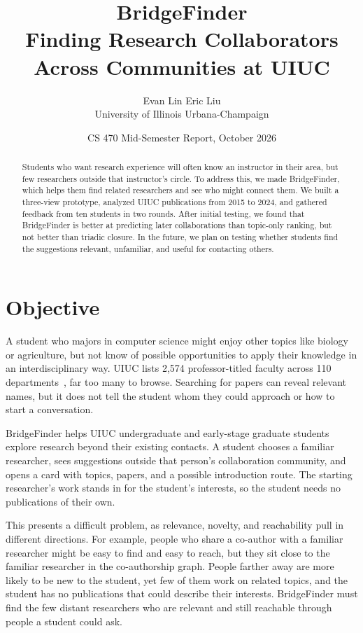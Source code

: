 \documentclass[10pt,twocolumn,letterpaper]{article}
\title{BridgeFinder\\Finding Research Collaborators Across Communities at UIUC}
\author{Evan Lin \qquad Eric Liu\\University of Illinois Urbana-Champaign}
\date{CS 470 Mid-Semester Report, October 2026}
\begin{document}
\raggedbottom
\maketitle

\begin{abstract}
Students who want research experience will often know an instructor in their area, but few researchers outside that instructor's circle. To address this, we made BridgeFinder, which helps them find related researchers and see who might connect them. We built a three-view prototype, analyzed UIUC publications from 2015 to 2024, and gathered feedback from ten students in two rounds. After initial testing, we found that BridgeFinder is better at predicting later collaborations than topic-only ranking, but not better than triadic closure. In the future, we plan on testing whether students find the suggestions relevant, unfamiliar, and useful for contacting others.
\end{abstract}

\section{Objective}
A student who majors in computer science might enjoy other topics like biology or agriculture, but not know of possible opportunities to apply their knowledge in an interdisciplinary way. UIUC lists 2,574 professor-titled faculty across 110 departments~\cite{graybook}, far too many to browse. Searching for papers can reveal relevant names, but it does not tell the student whom they could approach or how to start a conversation.

BridgeFinder helps UIUC undergraduate and early-stage graduate students explore research beyond their existing contacts. A student chooses a familiar researcher, sees suggestions outside that person's collaboration community, and opens a card with topics, papers, and a possible introduction route. The starting researcher's work stands in for the student's interests, so the student needs no publications of their own.

This presents a difficult problem, as relevance, novelty, and reachability pull in different directions. For example, people who share a co-author with a familiar researcher might be easy to find and easy to reach, but they sit close to the familiar researcher in the co-authorship graph. People farther away are more likely to be new to the student, yet few of them work on related topics, and the student has no publications that could describe their interests. BridgeFinder must find the few distant researchers who are relevant and still reachable through people a student could ask.
\end{document}
